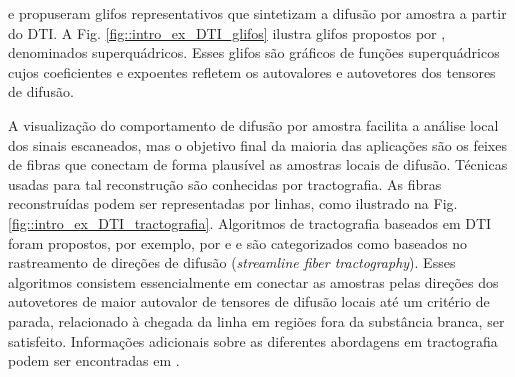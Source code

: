 \documentclass[
    12pt,                %
    oneside,            %
    a4paper,            %
    english,            %
    french,                %
    spanish,            %
    brazil                %
    ]{abntex2}
\begin{document}

 e  propuseram glifos representativos que sintetizam a difusão por amostra a partir do DTI. A Fig. \ref{fig::intro_ex_DTI_glifos} ilustra glifos propostos por , denominados superquádricos. Esses glifos são gráficos de funções superquádricos cujos coeficientes e expoentes refletem os autovalores e autovetores dos tensores de difusão.

A visualização do comportamento de difusão por amostra facilita a análise local dos sinais escaneados, mas o objetivo final da maioria das aplicações são os feixes de fibras que conectam de forma plausível as amostras locais de difusão. Técnicas usadas para tal reconstrução são conhecidas por tractografia. As fibras reconstruídas podem ser representadas por linhas, como ilustrado na Fig. \ref{fig::intro_ex_DTI_tractografia}. Algoritmos de tractografia baseados em DTI foram propostos, por exemplo, por  e  e são categorizados como baseados no rastreamento de direções de difusão (\textit{streamline fiber tractography}). Esses algoritmos consistem essencialmente em conectar as amostras pelas direções dos autovetores de maior autovalor de tensores de difusão locais até um critério de parada, relacionado à chegada da linha em regiões fora da substância branca,  ser satisfeito. Informações adicionais sobre as diferentes abordagens em tractografia podem ser encontradas em \cite{tournier2011, DTI_Handbook}.
\end{document}
